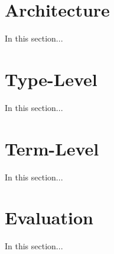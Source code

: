 \section{Architecture}

In this section...

\section{Type-Level}

In this section...

\section{Term-Level}

In this section...

\section{Evaluation}

In this section...
